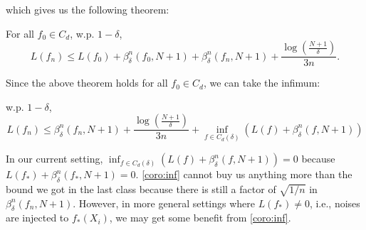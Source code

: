 \documentclass[twoside]{article}
\begin{document}
which gives us the following theorem:
\begin{theorem}
   For all $f_0\in C_d$, w.p. $1-\delta$,
   \begin{equation*}
      L(f_n)\le L(f_0)+\beta^n_{\delta}(f_0,N+1)+\beta^n_{\delta}(f_n,N+1)+\frac{\log(\frac{N+1}{\delta})}{3n}.
   \end{equation*}
\end{theorem}
Since the above theorem holds for all $f_0\in C_d$, we can take the infimum:
\begin{corollary}\label{coro:inf}
   w.p. $1-\delta$,
   \begin{equation*}
      L(f_n)\le \beta^n_{\delta}(f_n,N+1)+\frac{\log(\frac{N+1}{\delta})}{3n}+\inf_{f\in C_d(\delta)}\left( L(f)+\beta^n_{\delta}(f,N+1)\right)
   \end{equation*}
\end{corollary}
\begin{remark}
   In our current setting, $\inf_{f\in C_d(\delta)}(L(f)+\beta^n_{\delta}(f,N+1)) = 0$ because $L(f_*)+\beta^n_{\delta}(f_*,N+1)=0$. \cref{coro:inf} cannot buy us anything more than the bound we got in the last class because there is still a factor of $\sqrt{1/n}$ in $\beta_\delta^n(f_n,N+1)$. However, in more general settings where $L(f_*)\neq 0$, i.e., noises are injected to $f_*(X_i)$, we may get some benefit from \cref{coro:inf}.
\end{remark}
\end{document}
